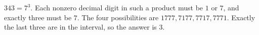 $ 343=7^3 $. Each nonzero decimal digit in such a product must be $ 1 $ or $ 7 $, and exactly three must be $ 7 $. The four possibilities are $ 1777,7177,7717,7771 $. Exactly the last three are in the interval, so the answer is $\boxed3 $.
